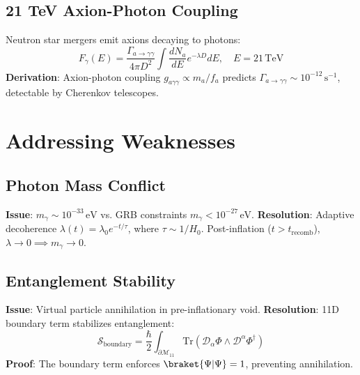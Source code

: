 \documentclass[12pt, a4paper]{article}
\begin{document}
\subsection{21 TeV Axion-Photon Coupling}  
\label{subsec:axion}  
Neutron star mergers emit axions decaying to photons:  
\begin{equation}  
F_{\gamma}(E) = \frac{\Gamma_{a \to \gamma\gamma}}{4\pi D^2} \int \frac{dN_a}{dE} e^{-\lambda D} dE, \quad E = 21 \, \text{TeV}  
\label{eq:axion_flux}  
\end{equation}  
\textbf{Derivation}: Axion-photon coupling \( g_{a\gamma\gamma} \propto m_a / f_a \) predicts \( \Gamma_{a \to \gamma\gamma} \sim 10^{-12} \, \text{s}^{-1} \), detectable by Cherenkov telescopes.  

\section{Addressing Weaknesses}  
\label{sec:weaknesses}  

\subsection{Photon Mass Conflict}  
\label{subsec:photon_mass}  
\textbf{Issue}: \( m_\gamma \sim 10^{-33} \, \text{eV} \) vs. GRB constraints \( m_\gamma < 10^{-27} \, \text{eV} \).  
\textbf{Resolution}: Adaptive decoherence \( \lambda(t) = \lambda_0 e^{-t/\tau} \), where \( \tau \sim 1/H_0 \). Post-inflation (\( t > t_{\text{recomb}} \)), \( \lambda \to 0 \implies m_\gamma \to 0 \).  

\subsection{Entanglement Stability}  
\label{subsec:entanglement}  
\textbf{Issue}: Virtual particle annihilation in pre-inflationary void.  
\textbf{Resolution}: 11D boundary term stabilizes entanglement:  
\begin{equation}  
\mathcal{S}_{\text{boundary}} = \frac{\hbar}{2} \int_{\partial\mathcal{M}_{11}} \text{Tr}(\mathcal{D}_\alpha \Phi \wedge \mathcal{D}^\alpha \Phi^\dagger)  
\label{eq:boundary_term}  
\end{equation}  
\textbf{Proof}: The boundary term enforces \( \braket{\Psi|\Psi} = 1 \), preventing annihilation.  
\end{document}

